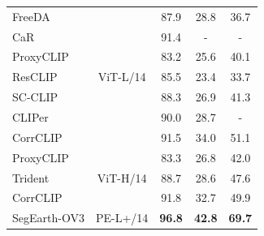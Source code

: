 \documentclass[twocolumn,switch,times]{article}
\newcommand{\samov}{SegEarth-OV\textcolor{cvprpink}{3}\xspace}
\begin{document}
\begin{table}[t]
{\begin{tabular}{lc|ccc}
    \midrule
    FreeDA~\citep{barsellotti2024training}& \multirow{7}{*}{ViT-L/14} & 87.9 & 28.8 & 36.7 \\
    CaR~\citep{sun2024clip}&  & 91.4 & - & - \\
    ProxyCLIP~\citep{lan2025proxyclip}&  & 83.2 & 25.6 & 40.1 \\
    ResCLIP~\citep{yang2025resclip}&& 85.5 & 23.4 & 33.7 \\
    SC-CLIP~\citep{bai2024self}&& 88.3 & 26.9 & 41.3 \\
    CLIPer~\citep{sun2025cliper}&& 90.0 & 28.7 & - \\
    \rowcolor{gray!8}
    CorrCLIP~\citep{zhang2025corrclip}&  & 91.5 & 34.0 & 51.1 \\
    
    \midrule
    ProxyCLIP~\citep{lan2025proxyclip}& \multirow{3}{*}{ViT-H/14} & 83.3 & 26.8 & 42.0 \\
    Trident~\citep{shi2025harnessing} & & 88.7 & 28.6 & 47.6 \\
    \rowcolor{gray!8}
    CorrCLIP~\citep{zhang2025corrclip}& & 91.8 & 32.7 & 49.9 \\
    \midrule
    \samov & PE-L+/14 & \textbf{96.8} & \textbf{42.8} & \textbf{69.7} \\
    \bottomrule
  \end{tabular}
  }
  \label{tab:general}
\end{table}







    
\end{document}
